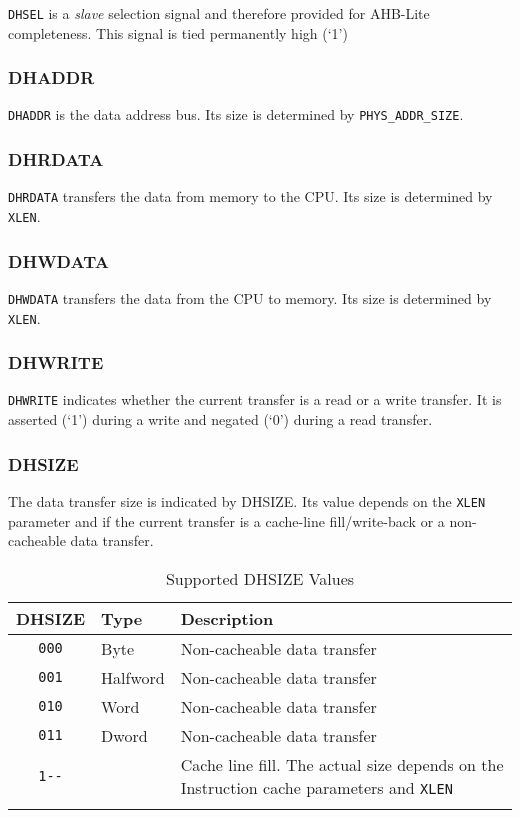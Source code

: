 \texttt{DHSEL} is a \emph{slave} selection signal and therefore provided for AHB-Lite
completeness. This signal is tied permanently high (`1')

\subsubsection{DHADDR}\label{dhaddr}

\texttt{DHADDR} is the data address bus. Its size is determined by
\texttt{PHYS\_ADDR\_SIZE}.

\subsubsection{DHRDATA}\label{dhrdata}

\texttt{DHRDATA} transfers the data from memory to the CPU. Its size is
determined by \texttt{XLEN}.

\subsubsection{DHWDATA}\label{dhwdata}

\texttt{DHWDATA} transfers the data from the CPU to memory. Its size is
determined by \texttt{XLEN}.

\subsubsection{DHWRITE}\label{dhwrite}

\texttt{DHWRITE} indicates whether the current transfer is a read or a write
transfer. It is asserted (`1') during a write and negated (`0') during a
read transfer.

\subsubsection{DHSIZE}\label{dhsize}

The data transfer size is indicated by DHSIZE. Its value depends on the
\texttt{XLEN} parameter and if the current transfer is a cache-line
fill/write-back or a non-cacheable data transfer.

\begin{longtable}[]{@{}clp{7.5cm}@{}}
\toprule
DHSIZE & Type & Description\tabularnewline
\midrule
\endhead
\texttt{000} & Byte & Non-cacheable data transfer\tabularnewline
\texttt{001} & Halfword & Non-cacheable data transfer\tabularnewline
\texttt{010} & Word & Non-cacheable data transfer\tabularnewline
\texttt{011} & Dword & Non-cacheable data transfer\tabularnewline
\texttt{1-\/-} & & Cache line fill. The actual size depends on the Instruction
cache parameters and \texttt{XLEN}\tabularnewline
\bottomrule
\caption{Supported DHSIZE Values}
\label{tab:dhsize-values}
\end{longtable}

